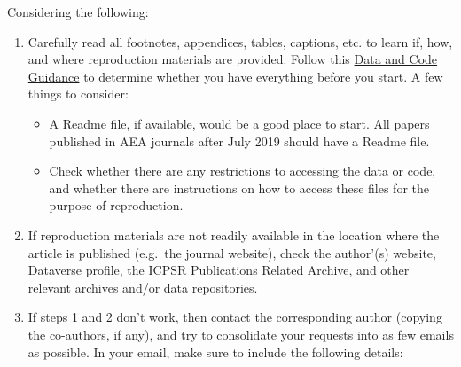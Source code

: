 \documentclass[]{book}
\providecommand{\tightlist}{%
  \setlength{\itemsep}{0pt}\setlength{\parskip}{0pt}}
\begin{document}
Considering the following:

\begin{enumerate}
\def\labelenumi{\arabic{enumi}.}
\item
  Carefully read all footnotes, appendices, tables, captions, etc. to learn if, how, and where reproduction materials are provided. Follow this \href{https://social-science-data-editors.github.io/guidance/Verification_guidance.html}{Data and Code Guidance} to determine whether you have everything before you start. A few things to consider:

  \begin{itemize}
  \tightlist
  \item
    A Readme file, if available, would be a good place to start. All papers published in AEA journals after July 2019 should have a Readme file.\\
  \item
    Check whether there are any restrictions to accessing the data or code, and whether there are instructions on how to access these files for the purpose of reproduction.
  \end{itemize}
\item
  If reproduction materials are not readily available in the location where the article is published (e.g.~the journal website), check the author'(s) website, Dataverse profile, the ICPSR Publications Related Archive, and other relevant archives and/or data repositories.
\item
  If steps 1 and 2 don't work, then contact the corresponding author (copying the co-authors, if any), and try to consolidate your requests into as few emails as possible. In your email, make sure to include the following details:


\end{enumerate}
\end{document}
